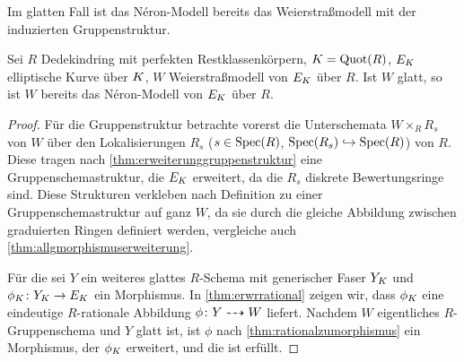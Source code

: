 Im glatten Fall ist das Néron-Modell bereits das Weierstraßmodell mit
der induzierten Gruppenstruktur.
\begin{Korollar}\label{thm:neronmausweierstrassgl}
  Sei $R$ Dedekindring mit perfekten Restklassenkörpern, $K=\operatorname{Quot}(R)$,
  $E_{K}$ elliptische Kurve über $K$, $W$ Weierstraßmodell von $E_{K}$
  über $R$.
  Ist $W$ glatt, so ist $W$ bereits das Néron-Modell von $E_{K}$ über
  $R$.
  \begin{proof}
    Für die Gruppenstruktur betrachte vorerst die Unterschemata
    $W\times_R R_s$ von $W$ über den Lokalisierungen
    $R_s$ ($s\in\operatorname{Spec}(R)$, $\operatorname{Spec}(R_s)\hookrightarrow\operatorname{Spec}(R)$) von $R$.
    Diese tragen nach \ref{thm:erweiterunggruppenstruktur} eine
    Gruppenschemastruktur, die $E_{K}$ erweitert, da die $R_s$ diskrete
    Bewertungsringe sind.
    Diese Strukturen  verkleben nach Definition zu einer
    Gruppenschemastruktur auf ganz $W$, da sie durch die gleiche
    Abbildung zwischen graduierten Ringen definiert werden, vergleiche
    auch \ref{thm:allgmorphismuserweiterung}.

    Für die \NAbbEig sei $Y$ ein weiteres glattes $R$-Schema mit
    generischer Faser $Y_{K}$ und $\phi_{K}\colon Y_{K}\to E_{K}$ ein
    Morphismus.
    In \ref{thm:erwrrational} zeigen wir, dass $\phi_{K}$ eine
    eindeutige $R$-rationale Abbildung $\phi\colon Y\dashrightarrow W$ liefert.
    Nachdem $W$ eigentliches $R$-Gruppenschema und $Y$ glatt ist, ist
    $\phi$ nach \ref{thm:rationalzumorphismus} ein Morphismus, der
    $\phi_{K}$ erweitert, und die \NAbbEig ist erfüllt.
  \end{proof}
\end{Korollar}

